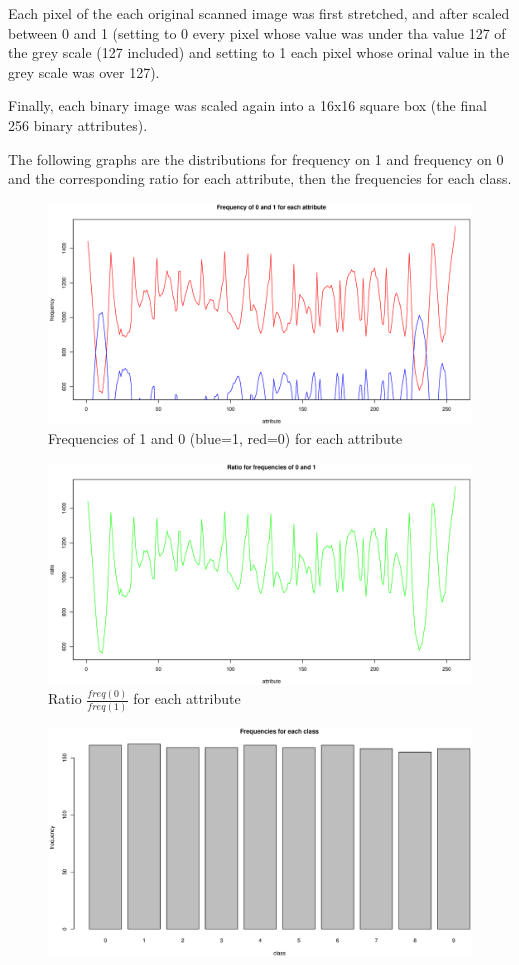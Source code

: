 \documentclass{article}
\begin{document}
Each pixel of the each original scanned image was first stretched, and after scaled between 0 and 1 (setting to 0 every pixel whose value was 
under tha value 127 of the grey scale (127 included) and setting to 1 each pixel whose orinal value in the grey scale was over 127).

Finally, each binary image was scaled again into a 16x16 square box (the final 256 binary attributes). 

The following graphs are the distributions for frequency on 1 and frequency on 0 and the corresponding ratio for each attribute, then the frequencies
for each class.

\begin{figure}[htp]
\centering
\includegraphics[width=11.3cm]{freq.eps}
\caption{Frequencies of 1 and 0 (blue=1, red=0) for each attribute}
\end{figure}

\begin{figure}[htp]
\centering
\includegraphics[width=11.3cm]{ratio.eps}
\caption{Ratio $\frac{freq(0)}{freq(1)}$ for each attribute}
\end{figure}

\begin{figure}[htp]
\centering
\includegraphics[width=11.3cm]{bclass.eps}
\end{figure}
\end{document}
